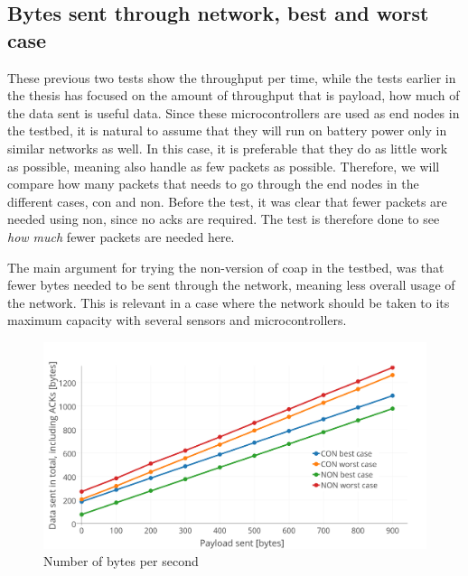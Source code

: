 
\newpage
\subsection{Bytes sent through network, best and worst case}

\noindent These previous two tests show the throughput per time, while the tests earlier in the thesis has focused on the amount of throughput that is \gls{payload}, how much of the data sent is useful data. Since these \glspl{microcontroller} are used as end nodes in the testbed, it is natural to assume that they will run on battery power only in similar networks as well. In this case, it is preferable that they do as little work as possible, meaning also handle as few packets as possible. Therefore, we will compare how many packets that needs to go through the end nodes in the different cases, \gls{con} and \gls{non}. Before the test, it was clear that fewer packets are needed using \gls{non}, since no \glspl{ack} are required. The test is therefore done to see \textit{how much} fewer packets are needed here.

\noindent The main argument for trying the \gls{non}-version of \gls{coap} in the testbed, was that fewer bytes needed to be sent through the network, meaning less overall usage of the network. This is relevant in a case where the network should be taken to its maximum capacity with several sensors and \glspl{microcontroller}. 

\begin{figure}[ht]
    \centering
    \includegraphics[width=1.0\textwidth]{bestCaseworstCase3.png}    
    \caption{Number of bytes per second}
    \label{fig:bestCaseworstCase}
\end{figure}

